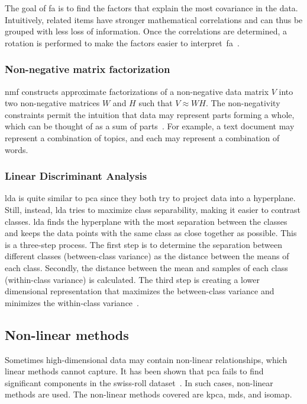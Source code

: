 The goal of \gls{fa} is to find the factors that explain the most covariance in the data. Intuitively, related items have stronger mathematical correlations and can thus be grouped with less loss of information. Once the correlations are determined, a rotation is performed to make the factors easier to interpret~\gls{fa}~\cite{decoster-1998-factor-analysis-overview}.


\subsubsection{Non-negative matrix factorization}\label{subsubsec:non-negative-matrix-factorization}
\gls{nmf} constructs approximate factorizations of a non-negative data matrix $V$ into two non-negative matrices $W$ and $H$ such that $V \approx WH$. The non-negativity constraints permit the intuition that data may represent parts forming a whole, which can be thought of as a sum of parts~\cite{lee-1999-learning-nmf}. For example, a text document may represent a combination of topics, and each may represent a combination of words.


\subsubsection{Linear Discriminant Analysis}\label{subsubsec:linear-discriminant-analysis}

\gls{lda} is quite similar to \gls{pca} since they both try to project data into a hyperplane. Still, instead, \gls{lda} tries to maximize class separability, making it easier to contrast classes. \gls{lda} finds the hyperplane with the most separation between the classes and keeps the data points with the same class as close together as possible. This is a three-step process. The first step is to determine the separation between different classes (between-class variance) as the distance between the means of each class. Secondly, the distance between the mean and samples of each class (within-class variance) is calculated. The third step is creating a lower dimensional representation that maximizes the between-class variance and minimizes the within-class variance~\cite{linear-discriminant-analysis-tutorial}.


\subsection{Non-linear methods}\label{subsec:non-linear-methods}
Sometimes high-dimensional data may contain non-linear relationships, which linear methods cannot capture. It has been shown that \gls{pca} fails to find significant components in the swiss-roll dataset~\cite{tennenbaum}. In such cases, non-linear methods are used. The non-linear methods covered are \gls{kpca}, \gls{mds}, and \gls{isomap}.


